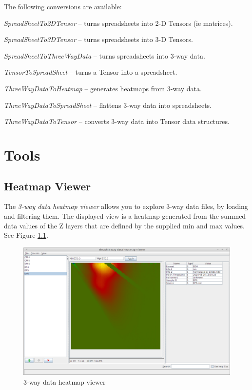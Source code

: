 \documentclass[a4paper]{book}
\begin{document}
\noindent The following conversions are available:
\begin{tight_itemize}
  \item \textit{SpreadSheetTo2DTensor} -- turns spreadsheets into 2-D Tensors (ie matrices).
  \item \textit{SpreadSheetTo3DTensor} -- turns spreadsheets into 3-D Tensors.
  \item \textit{SpreadSheetToThreeWayData} -- turns spreadsheets into 3-way data.
  \item \textit{TensorToSpreadSheet} -- turns a Tensor into a spreadsheet.
  \item \textit{ThreeWayDataToHeatmap} -- generates heatmaps from 3-way data.
  \item \textit{ThreeWayDataToSpreadSheet} -- flattens 3-way data into spreadsheets.
  \item \textit{ThreeWayDataToTensor} -- converts 3-way data into Tensor data structures.
\end{tight_itemize}

\chapter{Tools}
\section{Heatmap Viewer}
The \textit{3-way data heatmap viewer} allows you to explore 3-way data files,
by loading and filtering them. The displayed view is a heatmap generated from
the summed data values of the Z layers that are defined by the supplied min
and max values. See Figure \ref{heatmapviewer}.

\begin{figure}[htb]
  \centering
  \includegraphics[width=12.0cm]{images/heatmapviewer.png}
  \caption{3-way data heatmap viewer}
  \label{heatmapviewer}
\end{figure}


\end{document}
